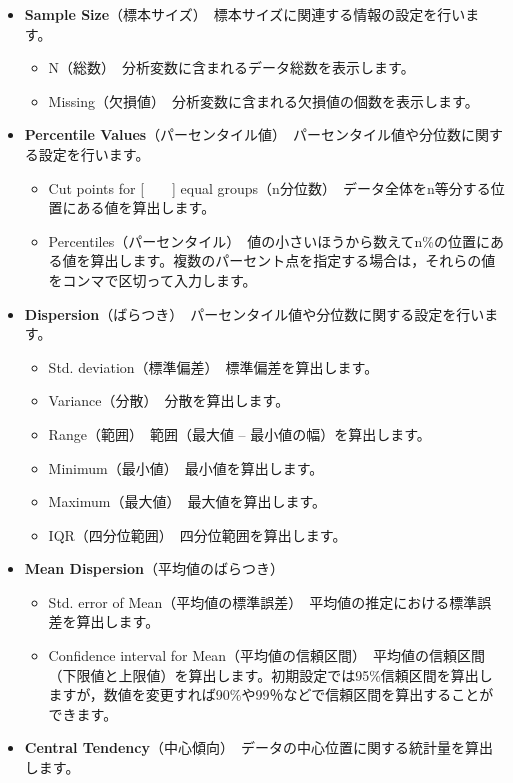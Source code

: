 \documentclass[
  12pt,
  a5jpaper,
  lualatex, ja=standard]{bxjsbook}
\providecommand{\tightlist}{%
  \setlength{\itemsep}{0pt}\setlength{\parskip}{0pt}}
\newenvironment{jmvsettings}{%
	\begin{center}%
	\begin{tcolorbox}[%
		title=設定項目,
		colframe=gmoji,
		colbacktitle=gmoji,
		colback=gmoji!2!white,
		breakable,
		width=.9\textwidth,
		]\small\addtolength{\leftmargini}{-3\labelsep}%
	}%
	{\end{tcolorbox}\end{center}}
\begin{document}
\begin{jmvsettings}

\begin{itemize}
\tightlist
\item
  \textbf{Sample Size}（標本サイズ）　標本サイズに関連する情報の設定を行います。

  \begin{itemize}
  \tightlist
  \item
    N（総数）　分析変数に含まれるデータ総数を表示します。
  \item
    Missing（欠損値）　分析変数に含まれる欠損値の個数を表示します。
  \end{itemize}
\item
  \textbf{Percentile Values}（パーセンタイル値）　パーセンタイル値や分位数に関する設定を行います。

  \begin{itemize}
  \tightlist
  \item
    Cut points for {[}　　{]} equal groups（n分位数）　データ全体をn等分する位置にある値を算出します。
  \item
    Percentiles（パーセンタイル）　値の小さいほうから数えてn\%の位置にある値を算出します。複数のパーセント点を指定する場合は，それらの値をコンマで区切って入力します。
  \end{itemize}
\item
  \textbf{Dispersion}（ばらつき）　パーセンタイル値や分位数に関する設定を行います。

  \begin{itemize}
  \tightlist
  \item
    Std. deviation（標準偏差）　標準偏差を算出します。
  \item
    Variance（分散）　分散を算出します。
  \item
    Range（範囲）　範囲（最大値 -- 最小値の幅）を算出します。
  \item
    Minimum（最小値）　最小値を算出します。
  \item
    Maximum（最大値）　最大値を算出します。
  \item
    IQR（四分位範囲）　四分位範囲を算出します。
  \end{itemize}
\item
  \textbf{Mean Dispersion}（平均値のばらつき）

  \begin{itemize}
  \tightlist
  \item
    Std. error of Mean（平均値の標準誤差）　平均値の推定における標準誤差を算出します。
  \item
    Confidence interval for Mean（平均値の信頼区間）　平均値の信頼区間（下限値と上限値）を算出します。初期設定では95\%信頼区間を算出しますが，数値を変更すれば90\%や99％などで信頼区間を算出することができます。
  \end{itemize}
\item
  \textbf{Central Tendency}（中心傾向）　データの中心位置に関する統計量を算出します。


\end{itemize}
\end{jmvsettings}
\end{document}
